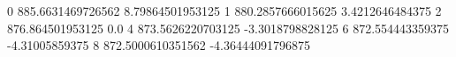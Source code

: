 0 885.6631469726562 8.79864501953125
1 880.2857666015625 3.4212646484375
2 876.864501953125 0.0
4 873.5626220703125 -3.3018798828125
6 872.554443359375 -4.31005859375
8 872.5000610351562 -4.36444091796875
